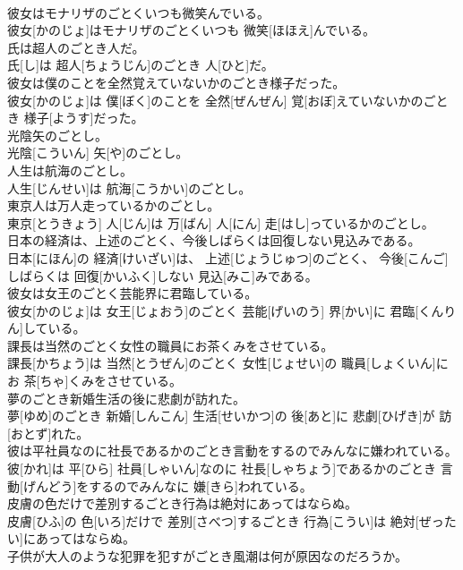 \documentclass[8pt]{extreport}
\begin{document}
\begin{CJK}{UTF8}{min}
\\	彼女はモナリザのごとくいつも微笑んでいる。	
\\	彼女[かのじょ]はモナリザのごとくいつも 微笑[ほほえ]んでいる。
\\	氏は超人のごとき人だ。	
\\	氏[し]は 超人[ちょうじん]のごとき 人[ひと]だ。
\\	彼女は僕のことを全然覚えていないかのごとき様子だった。	
\\	彼女[かのじょ]は 僕[ぼく]のことを 全然[ぜんぜん] 覚[おぼ]えていないかのごとき 様子[ようす]だった。
\\	光陰矢のごとし。	
\\	光陰[こういん] 矢[や]のごとし。
\\	人生は航海のごとし。	
\\	人生[じんせい]は 航海[こうかい]のごとし。
\\	東京人は万人走っているかのごとし。	
\\	東京[とうきょう] 人[じん]は 万[ばん] 人[にん] 走[はし]っているかのごとし。
\\	日本の経済は、上述のごとく、今後しばらくは回復しない見込みである。	
\\	日本[にほん]の 経済[けいざい]は、 上述[じょうじゅつ]のごとく、 今後[こんご]しばらくは 回復[かいふく]しない 見込[みこ]みである。
\\	彼女は女王のごとく芸能界に君臨している。	
\\	彼女[かのじょ]は 女王[じょおう]のごとく 芸能[げいのう] 界[かい]に 君臨[くんりん]している。
\\	課長は当然のごとく女性の職員にお茶くみをさせている。	
\\	課長[かちょう]は 当然[とうぜん]のごとく 女性[じょせい]の 職員[しょくいん]にお 茶[ちゃ]くみをさせている。
\\	夢のごとき新婚生活の後に悲劇が訪れた。	
\\	夢[ゆめ]のごとき 新婚[しんこん] 生活[せいかつ]の 後[あと]に 悲劇[ひげき]が 訪[おとず]れた。
\\	彼は平社員なのに社長であるかのごとき言動をするのでみんなに嫌われている。	
\\	彼[かれ]は 平[ひら] 社員[しゃいん]なのに 社長[しゃちょう]であるかのごとき 言動[げんどう]をするのでみんなに 嫌[きら]われている。
\\	皮膚の色だけで差別するごとき行為は絶対にあってはならぬ。	
\\	皮膚[ひふ]の 色[いろ]だけで 差別[さべつ]するごとき 行為[こうい]は 絶対[ぜったい]にあってはならぬ。
\\	子供が大人のような犯罪を犯すがごとき風潮は何が原因なのだろうか。	

\end{CJK}
\end{document}

